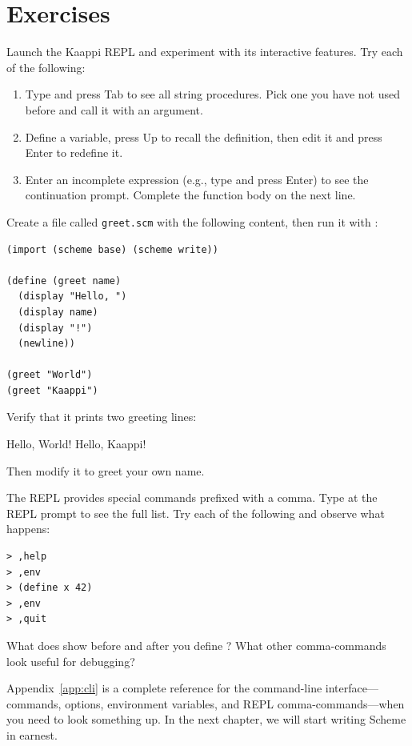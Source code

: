 \section*{Exercises}

\begin{exercise}
Launch the Kaappi REPL and experiment with its interactive features. Try each of the following:

\begin{enumerate}
    \item Type  and press Tab to see all string procedures. Pick one you have not used before and call it with an argument.
    \item Define a variable, press Up to recall the definition, then edit it and press Enter to redefine it.
    \item Enter an incomplete expression (e.g., type  and press Enter) to see the continuation prompt. Complete the function body on the next line.
\end{enumerate}
\end{exercise}

\begin{exercise}
Create a file called \texttt{greet.scm} with the following content, then run it with :

\begin{lstlisting}
(import (scheme base) (scheme write))

(define (greet name)
  (display "Hello, ")
  (display name)
  (display "!")
  (newline))

(greet "World")
(greet "Kaappi")
\end{lstlisting}

Verify that it prints two greeting lines:

\begin{codeoutput}
Hello, World!
Hello, Kaappi!
\end{codeoutput}

Then modify it to greet your own name.
\end{exercise}

\begin{exercise}
The REPL provides special commands prefixed with a comma. Type  at the REPL prompt to see the full list. Try each of the following and observe what happens:

\begin{lstlisting}[style=repl]
> ,help
> ,env
> (define x 42)
> ,env
> ,quit
\end{lstlisting}

What does  show before and after you define ? What other comma-commands look useful for debugging?
\end{exercise}

Appendix~\ref{app:cli} is a complete reference for the command-line interface---commands, options, environment variables, and REPL comma-commands---when you need to look something up. In the next chapter, we will start writing Scheme in earnest.

\chapterend
